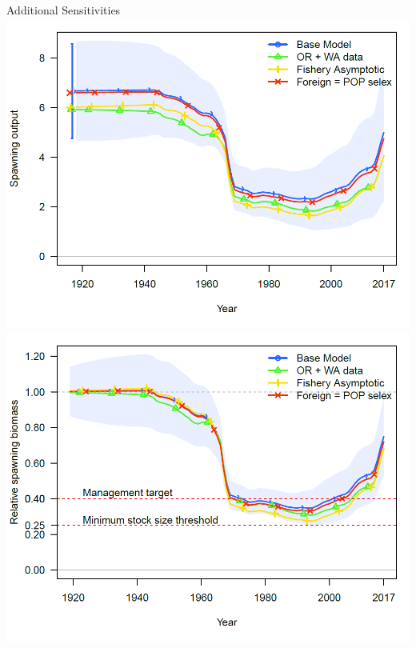 \documentclass[pdf]{beamer}\usepackage[]{graphicx}\usepackage[]{color}
\begin{document}
\begin{frame}{Additional Sensitivities}
  \includegraphics[scale = 0.24]{figures/ssb_sens3.png}
  \includegraphics[scale = 0.24]{figures/depl_sens3.png}
\end{frame}
\end{document}

